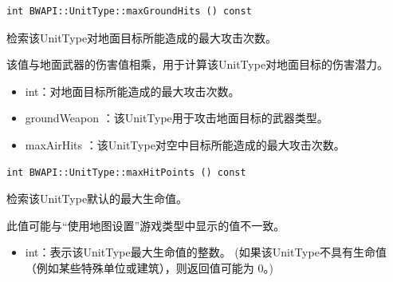 \begin{tcolorbox}[colback=white, colframe=black!60!white, title=maxGroundHits(), arc=0mm]
    \begin{verbatim}
int BWAPI::UnitType::maxGroundHits () const
    \end{verbatim}
    检索该UnitType对地面目标所能造成的最大攻击次数。
    \par 该值与地面武器的伤害值相乘，用于计算该UnitType对地面目标的伤害潜力。
    \begin{return}
        \begin{itemize}
            \item int：对地面目标所能造成的最大攻击次数。
        \end{itemize}
    \end{return}
    \begin{refer}
        \begin{itemize}
            \item groundWeapon  ：该UnitType用于攻击地面目标的武器类型。
            \item maxAirHits  ：该UnitType对空中目标所能造成的最大攻击次数。
        \end{itemize}
    \end{refer}
\end{tcolorbox}


\begin{tcolorbox}[colback=white, colframe=black!60!white, title=maxHitPoints(), arc=0mm]
    \begin{verbatim}
int BWAPI::UnitType::maxHitPoints () const
    \end{verbatim}
    检索该UnitType默认的最大生命值。
    \begin{note}
        此值可能与“使用地图设置”游戏类型中显示的值不一致。
    \end{note}
    \begin{return}
        \begin{itemize}
            \item int：表示该UnitType最大生命值的整数。
            (如果该UnitType不具有生命值（例如某些特殊单位或建筑），则返回值可能为 0。)
        \end{itemize}
    \end{return}
\end{tcolorbox}


